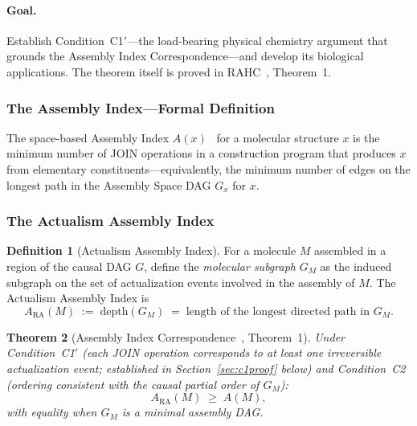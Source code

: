 \documentclass[11pt,a4paper]{article}
\theoremstyle{plain}
\newtheorem{theorem}{Theorem}[section]
\theoremstyle{definition}
\newtheorem{definition}[theorem]{Definition}
\theoremstyle{remark}
\newcommand{\ARA}{A_{\mathrm{RA}}}
\newcommand{\GM}{G_{M}}
\begin{document}
\paragraph{Goal.} Establish Condition~C1$'$---the load-bearing physical chemistry
argument that grounds the Assembly Index Correspondence---and develop its
biological applications. The theorem itself is proved in
RAHC~\citep{Sandeman2026RAHC}, Theorem~1.

\subsubsection{The Assembly Index---Formal Definition}

The space-based Assembly Index $A(x)$~\citep{Murray2023} for a molecular structure
$x$ is the minimum number of JOIN operations in a construction program that
produces $x$ from elementary constituents---equivalently, the minimum number of
edges on the longest path in the Assembly Space DAG $G_{x}$ for $x$.

\subsubsection{The Actualism Assembly Index}

\begin{definition}[Actualism Assembly Index]
For a molecule $M$ assembled in a region of the causal DAG $G$, define the
\emph{molecular subgraph} $\GM$ as the induced subgraph on the set of
actualization events involved in the assembly of $M$. The Actualism Assembly Index
is
\begin{equation}
  \ARA(M) \;:=\; \mathrm{depth}(\GM)
  \;=\; \text{length of the longest directed path in } \GM.
\end{equation}
\end{definition}

\begin{theorem}[Assembly Index Correspondence~{\normalfont\citep{Sandeman2026RAHC},
Theorem~1}]
\label{thm:assembly}
Under Condition~C1$'$ (each JOIN operation corresponds to at least one irreversible
actualization event; established in Section~\ref{sec:c1proof} below) and
Condition~C2 (ordering consistent with the causal partial order of $\GM$):
\begin{equation}
  \ARA(M) \;\geq\; A(M),
\end{equation}
with equality when $\GM$ is a minimal assembly DAG.
\end{theorem}
\end{document}
